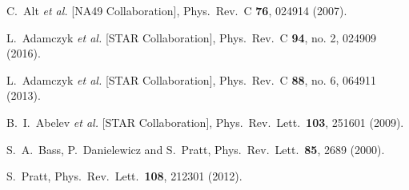 \begin{thebibliography}{99}
  C.~Alt {\it et al.} [NA49 Collaboration],
  Phys.\ Rev.\ C {\bf 76}, 024914 (2007).

  L.~Adamczyk {\it et al.} [STAR Collaboration],
  Phys.\ Rev.\ C {\bf 94}, no. 2, 024909 (2016).

  L.~Adamczyk {\it et al.} [STAR Collaboration],
  Phys.\ Rev.\ C {\bf 88}, no. 6, 064911 (2013).

  B.~I.~Abelev {\it et al.} [STAR Collaboration],
  Phys.\ Rev.\ Lett.\  {\bf 103}, 251601 (2009).

  S.~A.~Bass, P.~Danielewicz and S.~Pratt,
  Phys.\ Rev.\ Lett.\  {\bf 85}, 2689 (2000).

  S.~Pratt,
  Phys.\ Rev.\ Lett.\  {\bf 108}, 212301 (2012).



\end{thebibliography}

